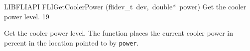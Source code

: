 \documentclass{article}
\begin{document}
\begin{cxxfunction}
{LIBFLIAPI}
        {FLIGetCoolerPower}
        {(flidev\_t\ dev,\ double*\ power)}
        {
 Get the cooler power level.}
        {19}
\begin{cxxdoc}

Get the cooler power level. The function places the current cooler
power in percent in the
location pointed to by \texttt{power}.


\end{cxxdoc}
\end{cxxfunction}
\end{document}
